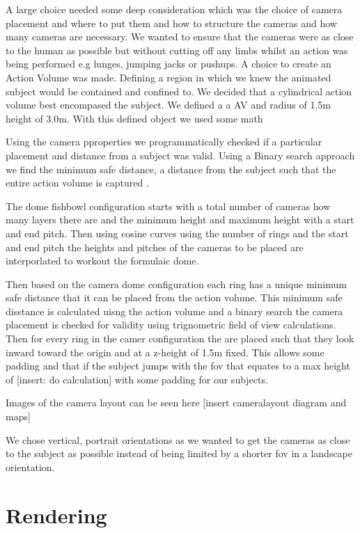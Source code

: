 A large choice needed some deep consideration which was the choice of camera placement and where to put them and how to structure the cameras and how many cameras are necessary.
We wanted to ensure that the cameras were as close to the human as possible but without cutting off any limbs whilst an action was being performed e.g lunges, jumping jacks or pushups.
A choice to create an Action Volume was made. Defining a region in which we knew the animated subject would be contained and confined to.
We decided that a cylindrical action volume best encompased the subject. We defined a a AV and radius of 1.5m height of 3.0m. With this defined object we used some math

Using the camera pproperties we programmatically checked if a particular placement and distance from a subject was valid. Using a Binary search approach we find the minimum safe distance, a distance from the subject such that the entire action volume is captured . 

The dome fishbowl configuration starts with a total number of cameras how many layers there are and the minimum height and maximum height with a start and end pitch. Then using cosine curves using the number of rings and the start and end pitch the heights and pitches of the cameras to be placed are interporlated to workout the formulaic dome.

Then based on the camera dome configuration each ring has a unique minimum safe distance that it can be placed from the action volume. This minimum safe disstance is calculated uisng the action volume and a binary search the camera placement is checked for validity using trignometric field of view calculations. Then for every ring in the camer configuration the are placed such that they look inward toward the origin and at a z-height of 1.5m fixed. This allows some padding and that if the subject jumps with the fov that equates to a max height of [insert: do calculation] with some padding for our subjects.

Images of the camera layout can be seen here [insert cameralayout diagram and maps]

We chose vertical, portrait orientations as we wanted to get the cameras as close to the subject as possible instead of being limited by a shorter fov in a landscape orientation.

\section{Rendering}

